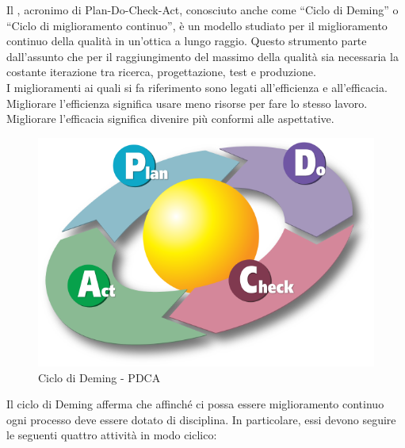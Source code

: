 
 \label{app:pdca}
Il , acronimo di Plan-Do-Check-Act, conosciuto anche come “Ciclo di Deming” o “Ciclo di miglioramento continuo”, è un modello studiato per il miglioramento continuo della qualità in un'ottica a lungo raggio. Questo strumento parte dall’assunto che per il raggiungimento del massimo della qualità sia necessaria la costante iterazione tra ricerca, progettazione, test e produzione.\\
I miglioramenti ai quali si fa riferimento sono legati all'efficienza e all'efficacia. Migliorare l'efficienza significa usare meno risorse per fare lo stesso lavoro. Migliorare l'efficacia significa divenire più conformi alle aspettative.\\
\begin{figure}[H]
	\centering
	\includegraphics[width=12cm]{PianoDiQualifica/Pics/PDCA_Cycle.png}
	\caption{Ciclo di Deming - PDCA}
\end{figure}
Il ciclo di Deming afferma che affinché ci possa essere miglioramento continuo ogni processo deve essere dotato di disciplina. In particolare, essi devono seguire le seguenti quattro attività in modo ciclico:
